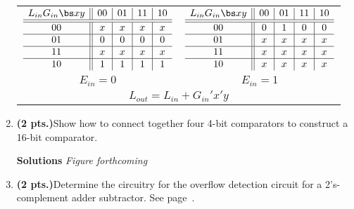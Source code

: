 \begin{enumerate}
\begin{onlysolution}
{                    \begin{tabular}{cc}
                        $
                        \begin{array} {c||c|c|c|c}
                            L_{in} G_{in}  \bs x  y & 00 & 01 & 11 & 10 \\ \hline \hline
                            00       & x  & x  & x  & x  \\ \hline
                            01       & 0  & 0  & 0  & 0  \\ \hline
                            11       & x  & x  & x  & x  \\ \hline
                            10       & 1  & 1  & 1  & 1  \\
                        \end{array}$
                        &
                        $
                        \begin{array} {c||c|c|c|c}
                            L_{in} G_{in}  \bs x  y & 00 & 01 & 11 & 10 \\ \hline \hline
                            00       & 0  & 1  & 0  & 0  \\ \hline
                            01       & x  & x  & x  & x  \\ \hline
                            11       & x  & x  & x  & x  \\ \hline
                            10       & x  & x  & x  & x  \\
                        \end{array}$  \\
                        $E_{in}=0$ & $E_{in}=1$ \\
                        \multicolumn{2}{c}{$L_{out} = L_{in} + G_{in}'x'y$} \\
                    \end{tabular}
                }
            \end{onlysolution}

        \item \textbf{ (2 pts.)}Show how to connect together four 4-bit comparators to
            construct a 16-bit comparator.

            \begin{onlysolution} \textbf{Solutions} \itshape{ Figure forthcoming}
            \end{onlysolution}

        \item \textbf{ (2 pts.)}Determine the circuitry for the overflow detection
            circuit for a 2's-complement adder subtractor.  See page~\pageref{4-page:Ovf}.


\end{enumerate}
